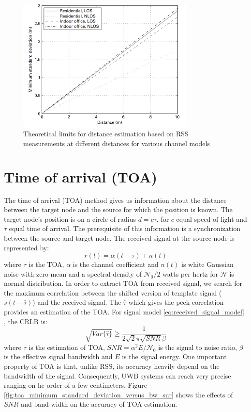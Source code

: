 \documentclass[\main/thesis.tex]{subfiles}
\begin{document}
\begin{figure}[htbp]
    \centering
    \includegraphics[width=0.8\textwidth]{limits_for_distance_estimation_based_on_rss_measurements}
    \caption{Theoretical limits for distance estimation based on RSS measurements at different distances for various channel models}
    \label{fig:limits_for_distance_estimation_based_on_rss_measurements}
\end{figure}

\section{Time of arrival (TOA)}

The time of arrival (TOA) method gives us information about the distance between the target node and the source for which the position is known. The target node's position is on a circle of radius $d=c\tau$, for $c$ equal speed of light and $\tau$ equal time of arrival. The prerequisite of this information is a synchronization between the source and target node. The received signal at the source node is represented by:
\begin{equation}
    r(t) = \alpha(t-\tau) + n(t)
\end{equation}
where $\tau$ is the TOA, $\alpha$ is the channel coefficient and $n(t)$ is white Gaussian noise with zero mean and a spectral density of $\mathcal{N}_0/2$ watts per hertz for $\mathcal{N}$ is normal distribution. In order to extract TOA from received signal, we search for the maximum correlation between the shifted version of template signal ($s(t-\hat{\tau})$) and the received signal. The $\hat{\tau}$ which gives the peek correlation provides an estimation of the TOA. For signal model \ref{eq:received_signal_model} , the CRLB is:
\begin{equation}
    \sqrt{Var\{\hat{\tau}\}} \geq \frac{1}{2\sqrt{2}\pi\sqrt{SNR}\beta}
\end{equation}
where $\tau$ is the estimation of TOA, $SNR = \alpha^2 E / \mathcal{N}_0$ is the signal to noise ratio, $\beta$ is the effective signal bandwidth and $E$ is the signal energy. One important property of TOA is that, unlike RSS, its accuracy heavily depend on the bandwidth of the signal. Consequently, UWB systems can reach very precise ranging on he order of a few centimeters. Figure \ref{fig:toa_minimum_standard_deviation_versus_bw_snr} shows the effects of $SNR$ and band width on the accuracy of TOA estimation.
\end{document}
